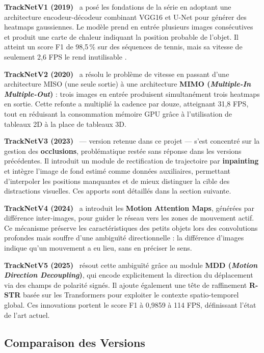 \begin{itemize}
\textbf{TrackNetV1 (2019)}~\cite{tracknet_v1} a posé les fondations de la série en adoptant une
architecture encodeur-décodeur combinant VGG16 et U-Net pour générer des heatmaps
gaussiennes. Le modèle prend en entrée plusieurs images consécutives et produit une
carte de chaleur indiquant la position probable de l'objet. Il atteint un score F1
de 98,5\,\% sur des séquences de tennis, mais sa vitesse de seulement 2,6 FPS le
rend inutilisable .

\textbf{TrackNetV2 (2020)}~\cite{tracknet_v2} a résolu le problème de vitesse en passant d'une
architecture MISO (une seule sortie) à une architecture
\textbf{MIMO (\textit{Multiple-In Multiple-Out})} : trois images en entrée
produisent simultanément trois heatmaps en sortie. Cette refonte a multiplié la
cadence par douze, atteignant 31,8 FPS, tout en réduisant la consommation mémoire
GPU grâce à l'utilisation de tableaux 2D à la place de tableaux 3D.

\textbf{TrackNetV3 (2023)}~\cite{tracknet_v3} — version retenue dans ce projet — s'est concentré sur
la gestion des \textbf{occlusions}, problématique restée sans réponse dans les
versions précédentes. Il introduit un module de rectification de trajectoire par
\textbf{inpainting} et intègre l'image de fond estimé comme données auxiliaires,
permettant d'interpoler les positions manquantes et de mieux distinguer la cible
des distractions visuelles. Ces apports sont détaillés dans la section suivante.

\textbf{TrackNetV4 (2024)}~\cite{tracknet_v4} a introduit les \textbf{Motion Attention Maps},
générées par différence inter-images, pour guider le réseau vers les zones de
mouvement actif. Ce mécanisme préserve les caractéristiques des petits objets lors
des convolutions profondes mais souffre d'une ambiguïté directionnelle : la
différence d'images indique qu'un mouvement a eu lieu, sans en préciser le sens.

\textbf{TrackNetV5 (2025)}~\cite{tracknet_v5} résout cette ambiguïté grâce au module
\textbf{MDD (\textit{Motion Direction Decoupling})}, qui encode explicitement la
direction du déplacement via des champs de polarité signés. Il ajoute également une
tête de raffinement \textbf{R-STR} basée sur les Transformers pour exploiter le
contexte spatio-temporel global. Ces innovations portent le score F1 à 0,9859 à
114 FPS, définissant l'état de l'art actuel.

\subsection{Comparaison des Versions}


\end{itemize}
